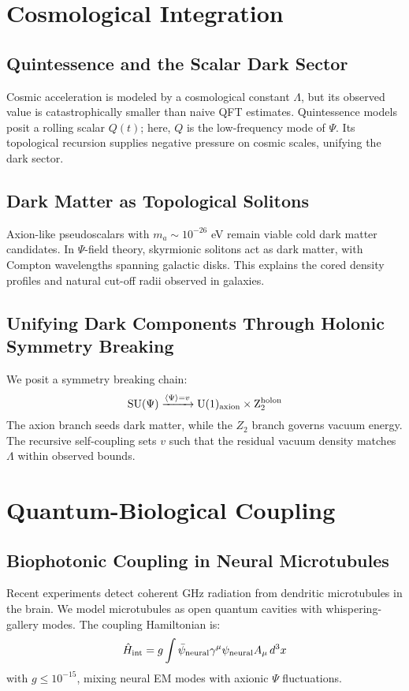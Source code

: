 \documentclass[aps,prx,twocolumn,nofootinbib,superscriptaddress,longbibliography]{revtex4-2}
\begin{document}
\section{Cosmological Integration}

\subsection{Quintessence and the Scalar Dark Sector}
Cosmic acceleration is modeled by a cosmological constant $\Lambda$, but its observed value is catastrophically smaller than naive QFT estimates. Quintessence models posit a rolling scalar $Q(t)$; here, $Q$ is the low-frequency mode of $\Psi$. Its topological recursion supplies negative pressure on cosmic scales, unifying the dark sector.

\subsection{Dark Matter as Topological Solitons}
Axion-like pseudoscalars with $m_a \sim 10^{-26}$ eV remain viable cold dark matter candidates. In $\Psi$-field theory, skyrmionic solitons act as dark matter, with Compton wavelengths spanning galactic disks. This explains the cored density profiles and natural cut-off radii observed in galaxies.

\subsection{Unifying Dark Components Through Holonic Symmetry Breaking}
We posit a symmetry breaking chain:
\begin{equation}
    \mathrm{SU}(\Psi) \xrightarrow{\langle\Psi\rangle = v} \mathrm{U}(1)_\text{axion} \times \mathrm{Z}_2^{\rm holon}
\end{equation}
The axion branch seeds dark matter, while the $Z_2$ branch governs vacuum energy. The recursive self-coupling sets $v$ such that the residual vacuum density matches $\Lambda$ within observed bounds.

\section{Quantum-Biological Coupling}

\subsection{Biophotonic Coupling in Neural Microtubules}
Recent experiments detect coherent GHz radiation from dendritic microtubules in the brain. We model microtubules as open quantum cavities with whispering-gallery modes. The coupling Hamiltonian is:
\begin{equation}
    \hat{H}_{\rm int} = g \int \bar{\psi}_{\rm neural}\gamma^\mu\psi_{\rm neural}A_\mu\,d^3x
\end{equation}
with $g \leq 10^{-15}$, mixing neural EM modes with axionic $\Psi$ fluctuations.
\end{document}
